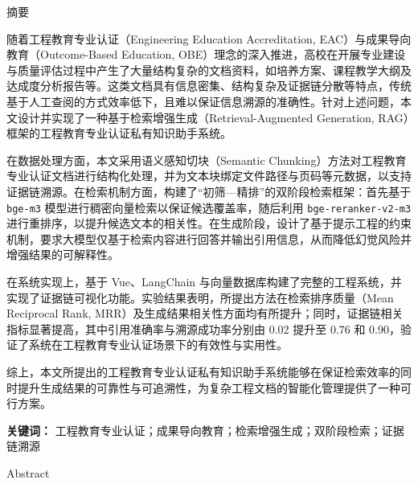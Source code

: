 \documentclass[UTF8,a4paper,zihao=-4]{ctexart}
\begin{document}

\begin{center}
    {\heiti{} 摘\hspace{2em}要}
\end{center}
随着工程教育专业认证（Engineering Education Accreditation, EAC）与成果导向教育（Outcome-Based Education, OBE）理念的深入推进，高校在开展专业建设与质量评估过程中产生了大量结构复杂的文档资料，如培养方案、课程教学大纲及达成度分析报告等。这类文档具有信息密集、结构复杂及证据链分散等特点，传统基于人工查阅的方式效率低下，且难以保证信息溯源的准确性。针对上述问题，本文设计并实现了一种基于检索增强生成（Retrieval-Augmented Generation, RAG）框架的工程教育专业认证私有知识助手系统。

在数据处理方面，本文采用语义感知切块（Semantic Chunking）方法对工程教育专业认证文档进行结构化处理，并为文本块绑定文件路径与页码等元数据，以支持证据链溯源。在检索机制方面，构建了“初筛—精排”的双阶段检索框架：首先基于 \texttt{bge-m3} 模型进行稠密向量检索以保证候选覆盖率，随后利用 \texttt{bge-reranker-v2-m3} 进行重排序，以提升候选文本的相关性。在生成阶段，设计了基于提示工程的约束机制，要求大模型仅基于检索内容进行回答并输出引用信息，从而降低幻觉风险并增强结果的可解释性。

在系统实现上，基于 Vue、LangChain 与向量数据库构建了完整的工程系统，并实现了证据链可视化功能。实验结果表明，所提出方法在检索排序质量（Mean Reciprocal Rank, MRR）及生成结果相关性方面均有所提升；同时，证据链相关指标显著提高，其中引用准确率与溯源成功率分别由 0.02 提升至 0.76 和 0.90，验证了系统在工程教育专业认证场景下的有效性与实用性。

综上，本文所提出的工程教育专业认证私有知识助手系统能够在保证检索效率的同时提升生成结果的可靠性与可追溯性，为复杂工程文档的智能化管理提供了一种可行方案。

\noindent\textbf{关键词：} 工程教育专业认证；成果导向教育；检索增强生成；双阶段检索；证据链溯源

\newpage


\clearpage
\begin{center}
    {\rmfamily{} Abstract}
\end{center}
\end{document}
